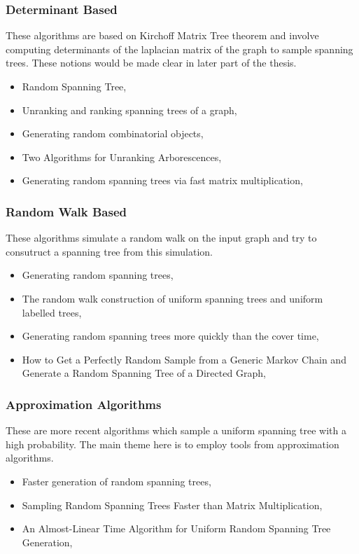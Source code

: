 \subsubsection{Determinant Based }
These algorithms are based on Kirchoff Matrix Tree theorem and involve computing determinants of the laplacian matrix of the graph  to sample spanning trees. These notions would be made clear in later part of the thesis.

\begin{itemize}
\item Random Spanning Tree, \cite{GUENOCHE1983214}
\item Unranking and ranking spanning trees of a graph, \cite{COLBOURN1989271}
\item Generating random combinatorial objects, \cite{KULKARNI1990185}
\item Two Algorithms for Unranking Arborescences, \cite{COLBOURN1996268}
\item Generating random spanning trees via fast matrix multiplication, \cite{harvey2016generating}
\end{itemize}


\subsubsection{Random Walk Based}
These algorithms simulate a random walk on the input graph and try to consutruct a spanning tree from this simulation.
\begin{itemize}
\item Generating random spanning trees, \cite{63516}
\item The random walk construction of uniform spanning trees and uniform labelled trees, \cite{aldous1990random}
\item Generating random spanning trees more quickly than the cover time, \cite{10.1145/237814.237880}
\item How to Get a Perfectly Random Sample from a Generic Markov Chain and Generate a Random Spanning Tree of a Directed Graph, \cite{Propp1998HowTG}

\end{itemize}


\subsubsection{Approximation Algorithms}
These are more recent algorithms which sample a uniform spanning tree with a high probability. The main theme here is to employ tools from approximation algorithms. 
\begin{itemize}
\item Faster generation of random spanning trees, \cite{10.5555/1747597.1748019}
\item Sampling Random Spanning Trees Faster than Matrix Multiplication, \cite{10.1145/3055399.3055499}
\item An Almost-Linear Time Algorithm for Uniform Random Spanning Tree Generation, \cite{10.1145/3188745.3188852}
\end{itemize}




